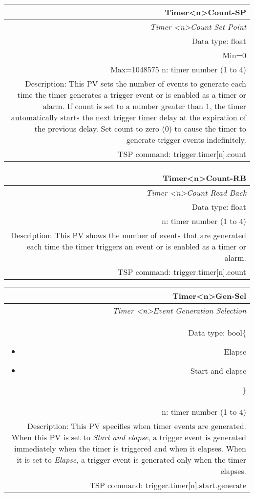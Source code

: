 \documentclass[openany]{article}
\begin{document}
		\begin{tabular}{N}
			\hline
			\bfseries Timer{\textless n\textgreater}Count-SP\label{pv:timercount-sp} \\ \hline
			\emph{Timer \textless n\textgreater Count Set Point} \\
			Data type: float \\
			Min=0 \\
			Max=1048575
			n: timer number (1 to 4) \\
			Description: This PV sets the number of events to generate each time the timer generates a trigger event or is enabled as a timer or alarm. If count is set to a number greater than 1, the timer automatically starts the next trigger timer delay at the expiration of the previous delay. Set count to zero (0) to cause the timer to generate trigger events indefinitely. \\
			TSP command: trigger.timer[n].count
		\end{tabular}

		\begin{tabular}{N}
			\hline
			\bfseries Timer{\textless n\textgreater}Count-RB\label{pv:timercount-rb} \\ \hline
			\emph{Timer \textless n\textgreater Count Read Back} \\
			Data type: float \\
			n: timer number (1 to 4) \\
			Description: This PV shows the number of events that are generated each time the timer triggers an event or is enabled as a timer or alarm. \\
			TSP command: trigger.timer[n].count
		\end{tabular}

		\begin{tabular}{N}
			\hline
			\bfseries Timer{\textless n\textgreater}Gen-Sel\label{pv:timergen-sel} \\ \hline
			\emph{Timer \textless n\textgreater Event Generation Selection} \\
			Data type: bool\{\begin{itemize}[noitemsep]
				\small
				\item[] Elapse
				\item[] Start and elapse
			\end{itemize}\} \\
			n: timer number (1 to 4) \\
			Description: This PV specifies when timer events are generated. When this PV is set to \emph{Start and elapse}, a trigger event is generated immediately when the timer is triggered and when it elapses. When it is set to \emph{Elapse}, a trigger event is generated only when the timer elapses. \\
			TSP command: trigger.timer[n].start.generate
		\end{tabular}
\end{document}
